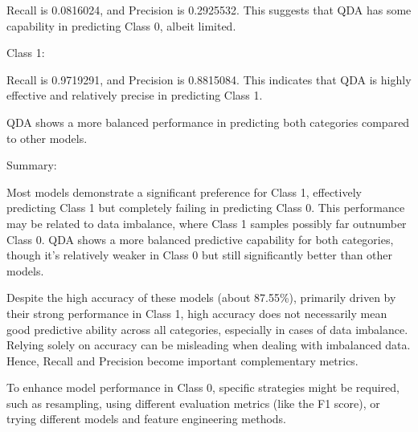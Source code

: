 \documentclass[
]{article}
\begin{document}
Recall is 0.0816024, and Precision is 0.2925532. This suggests that QDA
has some capability in predicting Class 0, albeit limited.

Class 1:

Recall is 0.9719291, and Precision is 0.8815084. This indicates that QDA
is highly effective and relatively precise in predicting Class 1.

QDA shows a more balanced performance in predicting both categories
compared to other models.

Summary:

Most models demonstrate a significant preference for Class 1,
effectively predicting Class 1 but completely failing in predicting
Class 0. This performance may be related to data imbalance, where Class
1 samples possibly far outnumber Class 0. QDA shows a more balanced
predictive capability for both categories, though it's relatively weaker
in Class 0 but still significantly better than other models.

Despite the high accuracy of these models (about 87.55\%), primarily
driven by their strong performance in Class 1, high accuracy does not
necessarily mean good predictive ability across all categories,
especially in cases of data imbalance. Relying solely on accuracy can be
misleading when dealing with imbalanced data. Hence, Recall and
Precision become important complementary metrics.

To enhance model performance in Class 0, specific strategies might be
required, such as resampling, using different evaluation metrics (like
the F1 score), or trying different models and feature engineering
methods.
\end{document}
